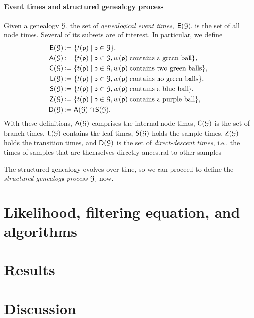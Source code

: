 \documentclass[11pt,reqno,final]{amsart}\usepackage[]{graphicx}\usepackage[]{color}
\begin{document}
\paragraph{Event times and structured genealogy process}

Given a genealogy $\mathcal{G}$, the set of \emph{genealogical event times}, $\mathsf{E}(\mathcal{G})$, is the set of all node times.
Several of its subsets are of interest.
In particular, we define
\begin{equation*}
  \begin{aligned}
    \mathsf{E}(\mathcal{G}) &\coloneqq \{t(\mathsf{p})\;|\;\mathsf{p}\in\mathcal{G}\}, \\
    \mathsf{A}(\mathcal{G}) &\coloneqq \{t(\mathsf{p})\;|\;\mathsf{p}\in\mathcal{G}, w(\mathsf{p})\ \text{contains a green ball}\}, \\
    \mathsf{C}(\mathcal{G}) &\coloneqq \{t(\mathsf{p})\;|\;\mathsf{p}\in\mathcal{G}, w(\mathsf{p})\ \text{contains two green balls}\}, \\
    \mathsf{L}(\mathcal{G}) &\coloneqq \{t(\mathsf{p})\;|\;\mathsf{p}\in\mathcal{G}, w(\mathsf{p})\ \text{contains no green balls}\}, \\
    \mathsf{S}(\mathcal{G}) &\coloneqq \{t(\mathsf{p})\;|\;\mathsf{p}\in\mathcal{G}, w(\mathsf{p})\ \text{contains a blue ball}\},\\
    \mathsf{Z}(\mathcal{G}) &\coloneqq \{t(\mathsf{p})\;|\;\mathsf{p}\in\mathcal{G}, w(\mathsf{p})\ \text{contains a purple ball}\},\\
    \mathsf{D}(\mathcal{G}) &\coloneqq \mathsf{A}(\mathcal{G}) \cap \mathsf{S}(\mathcal{G}).
  \end{aligned}
\end{equation*}
With these definitions,
$\mathsf{A}(\mathcal{G})$ comprises the internal node times,
$\mathsf{C}(\mathcal{G})$ is the set of branch times,
$\mathsf{L}(\mathcal{G})$ contains the leaf times,
$\mathsf{S}(\mathcal{G})$ holds the sample times,
$\mathsf{Z}(\mathcal{G})$ holds the transition times,
and $\mathsf{D}(\mathcal{G})$ is the set of \emph{direct-descent times},
i.e., the times of samples that are themselves directly ancestral to other samples.


The structured genealogy evolves over time, so we can proceed to define the \emph{structured genealogy process} $\mathcal{G}_t$ now.



\section{Likelihood, filtering equation, and algorithms}


\section{Results}


\section{Discussion}






\end{document}
